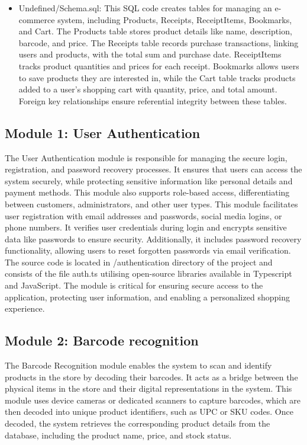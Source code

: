 \documentclass[conference]{IEEEtran}
\begin{document}
\begin{itemize}
\item Undefined/Schema.sql:	This SQL code creates tables for managing an e-commerce system, including Products, Receipts, ReceiptItems, Bookmarks, and Cart. The Products table stores product details like name, description, barcode, and price. The Receipts table records purchase transactions, linking users and products, with the total sum and purchase date. ReceiptItems tracks product quantities and prices for each receipt. Bookmarks allows users to save products they are interested in, while the Cart table tracks products added to a user's shopping cart with quantity, price, and total amount. Foreign key relationships ensure referential integrity between these tables.
\end{itemize}

\subsection{Module 1: User Authentication} 
The User Authentication module is responsible for managing the secure login, registration, and password recovery processes. It ensures that users can access the system securely, while protecting sensitive information like personal details and payment methods. This module also supports role-based access, differentiating between customers, administrators, and other user types.
This module facilitates user registration with email addresses and passwords, social media logins, or phone numbers. It verifies user credentials during login and encrypts sensitive data like passwords to ensure security. Additionally, it includes password recovery functionality, allowing users to reset forgotten passwords via email verification. The source code is located in /authentication directory of the project and consists of the file auth.ts utilising open-source libraries available in Typescript and JavaScript. The module is critical for ensuring secure access to the application, protecting user information, and enabling a personalized shopping experience.

\subsection{Module 2: Barcode recognition}
The Barcode Recognition module enables the system to scan and identify products in the store by decoding their barcodes. It acts as a bridge between the physical items in the store and their digital representations in the system.
This module uses device cameras or dedicated scanners to capture barcodes, which are then decoded into unique product identifiers, such as UPC or SKU codes. Once decoded, the system retrieves the corresponding product details from the database, including the product name, price, and stock status.
 
\end{document}
